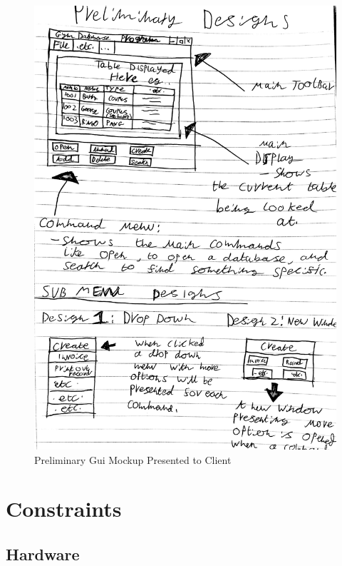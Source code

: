 \begin{figure}[H]
    \includegraphics[width=\textwidth]{Prelim Designs (1).jpg}
    \caption{Preliminary Gui Mockup Presented to Client} \label{fig: Preliminary Gui Mockup Presented to Client}
\end{figure}

\section{Constraints}

\subsection{Hardware}

